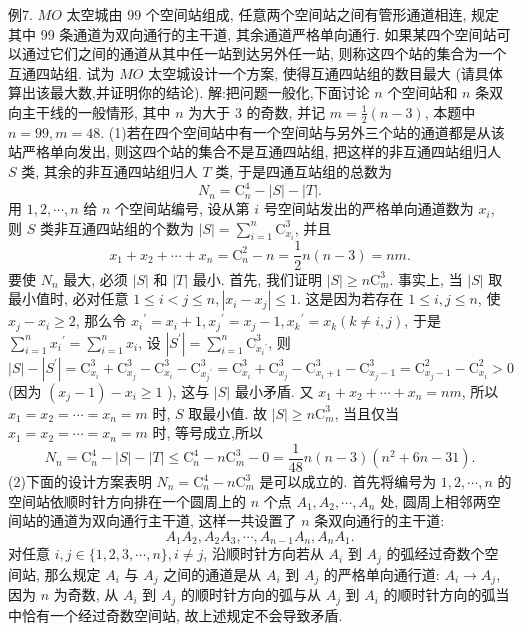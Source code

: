 例7. $M O$ 太空城由 99 个空间站组成, 任意两个空间站之间有管形通道相连, 规定其中 99 条通道为双向通行的主干道, 其余通道严格单向通行.
如果某四个空间站可以通过它们之间的通道从其中任一站到达另外任一站, 则称这四个站的集合为一个互通四站组.
试为 $M O$ 太空城设计一个方案, 使得互通四站组的数目最大 (请具体算出该最大数,并证明你的结论).
解:把问题一般化,下面讨论 $n$ 个空间站和 $n$ 条双向主干线的一般情形, 其中 $n$ 为大于 3 的奇数, 并记 $m=\frac{1}{2}(n-3)$, 本题中 $n=99, m=48$.
(1)若在四个空间站中有一个空间站与另外三个站的通道都是从该站严格单向发出, 则这四个站的集合不是互通四站组, 把这样的非互通四站组归人 $S$ 类, 其余的非互通四站组归人 $T$ 类, 于是四通互站组的总数为
$$
N_n=\mathrm{C}_n^4-|S|-|T| .
$$
用 $1,2, \cdots, n$ 给 $n$ 个空间站编号, 设从第 $i$ 号空间站发出的严格单向通道数为 $x_i$, 则 $S$ 类非互通四站组的个数为 $|S|=\sum_{i=1}^n \mathrm{C}_{x_i}^3$, 并且
$$
x_1+x_2+\cdots+x_n=\mathrm{C}_n^2-n=\frac{1}{2} n(n-3)=n m .
$$
要使 $N_n$ 最大, 必须 $|S|$ 和 $|T|$ 最小.
首先, 我们证明 $|S| \geqslant n \mathrm{C}_m^3$. 事实上, 当 $|S|$ 取最小值时, 必对任意 $1 \leqslant i<j \leqslant n,\left|x_i-x_j\right| \leqslant 1$. 这是因为若存在 $1 \leqslant i, j \leqslant n$, 使 $x_j-x_i \geqslant 2$, 那么令 $x_i{ }^{\prime}=x_i+1, x_j{ }^{\prime}=x_j-1, x_k{ }^{\prime}=x_k(k \neq i, j)$, 于是 $\sum_{i=1}^n x_i{ }^{\prime}=\sum_{i=1}^n x_i$, 设 $\left|S^{\prime}\right|=\sum_{i=1}^n \mathrm{C}_{x_i{ }^{\prime}}^3$, 则 $|S|-\left|S^{\prime}\right|=\mathrm{C}_{x_i}^3+\mathrm{C}_{x_j}^3-\mathrm{C}_{x_i}^3-\mathrm{C}_{x_j{ }^{\prime}}^3=\mathrm{C}_{x_i}^3+\mathrm{C}_{x_j}^3- \mathrm{C}_{x_i+1}^3-\mathrm{C}_{x_j-1}^3=\mathrm{C}_{x_j-1}^2-\mathrm{C}_{x_i}^2>0$ (因为 $\left(x_j-1\right)-x_i \geqslant 1$ ), 这与 $|S|$ 最小矛盾.
又 $x_1+x_2+\cdots+x_n=n m$, 所以 $x_1=x_2=\cdots=x_n=m$ 时, $S$ 取最小值.
故 $|S| \geqslant n \mathrm{C}_m^3$, 当且仅当 $x_1=x_2=\cdots=x_n=m$ 时, 等号成立,所以
$$
N_n=\mathrm{C}_n^4-|S|-|T| \leqslant \mathrm{C}_n^4-n \mathrm{C}_m^3-0=\frac{1}{48} n(n-3)\left(n^2+6 n-31\right) .
$$
(2)下面的设计方案表明 $N_n=\mathrm{C}_n^4-n \mathrm{C}_m^3$ 是可以成立的.
首先将编号为 $1,2, \cdots, n$ 的空间站依顺时针方向排在一个圆周上的 $n$ 个点 $A_1, A_2, \cdots, A_n$ 处, 圆周上相邻两空间站的通道为双向通行主干道, 这样一共设置了 $n$ 条双向通行的主干道:
$$
A_1 A_2, A_2 A_3, \cdots, A_{n-1} A_n, A_n A_1 .
$$
对任意 $i, j \in\{1,2,3, \cdots, n\}, i \neq j$, 沿顺时针方向若从 $A_i$ 到 $A_j$ 的弧经过奇数个空间站, 那么规定 $A_i$ 与 $A_j$ 之间的通道是从 $A_i$ 到 $A_j$ 的严格单向通行道: $A_i \rightarrow A_j$, 因为 $n$ 为奇数, 从 $A_i$ 到 $A_j$ 的顺时针方向的弧与从 $A_j$ 到 $A_i$ 的顺时针方向的弧当中恰有一个经过奇数空间站, 故上述规定不会导致矛盾.
